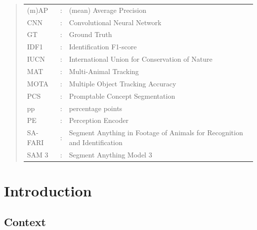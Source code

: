 \documentclass[author={Jacob Stephenson},
    degree={BSc},
    title={Robust Great Ape Species Detection in Wild Camera Trap Imagery with Promptable Concept Segmentation},
    unit={COMS30045},
    subtitle={}]{dissertation}
\begin{document}
\begin{quote}
\noindent
\begin{tabular}{lcl}
    (m)AP & : & (mean) Average Precision \\
    CNN & : & Convolutional Neural Network \\
    GT & : & Ground Truth \\
    IDF1 & : & Identification F1-score \\
    IUCN & : & International Union for Conservation of Nature \\
    MAT & : & Multi-Animal Tracking \\
    MOTA & : & Multiple Object Tracking Accuracy \\
    PCS & : & Promptable Concept Segmentation \\
    pp & : & percentage points \\
    PE & : & Perception Encoder \\
    SA-FARI & : & Segment Anything in Footage of Animals for Recognition and Identification \\
    SAM 3 & : & Segment Anything Model 3 \\
\end{tabular}
\end{quote}




%

\mainmatter


\chapter{Introduction}
\label{chap:intro}

\section{Context}
\label{sec:intro_context}
\end{document}
